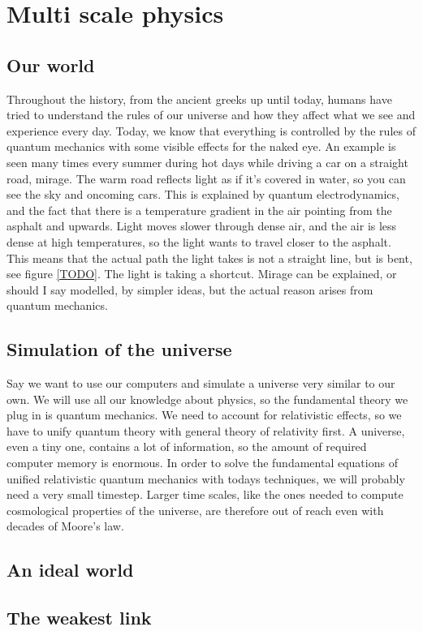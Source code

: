 \section{Multi scale physics}

\subsection{Our world}
Throughout the history, from the ancient greeks up until today, humans have tried to understand the rules of our universe and how they affect what we see and experience every day. Today, we know that everything is controlled by the rules of quantum mechanics with some visible effects for the naked eye. An example is seen many times every summer during hot days while driving a car on a straight road, mirage. The warm road reflects light as if it's covered in water, so you can see the sky and oncoming cars. This is explained by quantum electrodynamics, and the fact that there is a temperature gradient in the air pointing from the asphalt and upwards. Light moves slower through dense air, and the air is less dense at high temperatures, so the light wants to travel closer to the asphalt. This means that the actual path the light takes is not a straight line, but is bent, see figure \ref{TODO}. The light is taking a shortcut. Mirage can be explained, or should I say modelled, by simpler ideas, but the actual reason arises from quantum mechanics. 

\subsection{Simulation of the universe}
Say we want to use our computers and simulate a universe very similar to our own. We will use all our knowledge about physics, so the fundamental theory we plug in is quantum mechanics. We need to account for relativistic effects, so we have to unify quantum theory with general theory of relativity first. A universe, even a tiny one, contains a lot of information, so the amount of required computer memory is enormous. In order to solve the fundamental equations of unified relativistic quantum mechanics with todays techniques, we will probably need a very small timestep. Larger time scales, like the ones needed to compute cosmological properties of the universe, are therefore out of reach even with decades of Moore's law. 

\subsection{An ideal world}

\subsection{The weakest link}

